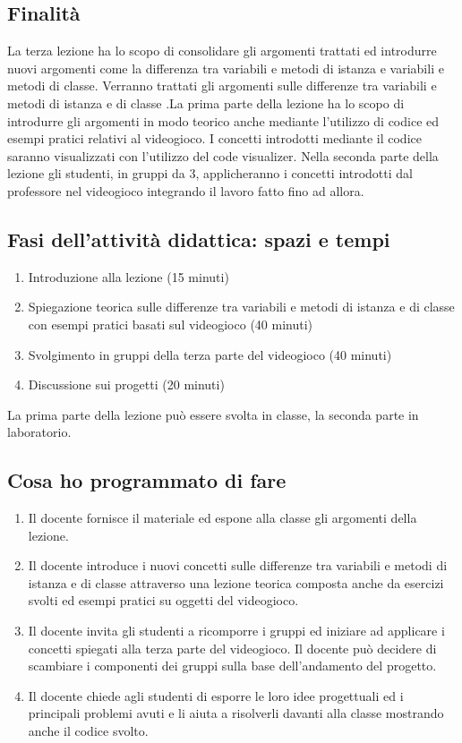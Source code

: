 \documentclass[12pt,a4paper]{article}
\begin{document}
\subsection*{Finalità}
La terza lezione ha lo scopo di consolidare gli argomenti trattati ed introdurre nuovi argomenti come la differenza tra variabili e metodi di istanza e variabili e metodi di classe. Verranno trattati gli argomenti sulle differenze tra variabili e metodi di istanza e di classe .La prima parte della lezione ha lo scopo di introdurre gli argomenti in modo teorico anche mediante l’utilizzo di codice ed esempi pratici relativi al videogioco. I concetti introdotti mediante il codice saranno visualizzati con l’utilizzo del code visualizer. Nella seconda parte della lezione gli studenti, in gruppi da 3, applicheranno i concetti introdotti dal professore nel videogioco integrando il lavoro fatto fino ad allora. 


\subsection*{Fasi dell'attività didattica: spazi e tempi}

\begin{enumerate}
    \item Introduzione alla lezione (15 minuti)
\item Spiegazione teorica sulle differenze tra variabili e metodi di istanza e di classe con esempi pratici basati sul videogioco (40 minuti)
\item Svolgimento in gruppi della terza parte del videogioco (40 minuti)
\item Discussione sui progetti (20 minuti)

\end{enumerate}
La prima parte della lezione può essere svolta in classe, la seconda parte in laboratorio.

\subsection*{Cosa ho programmato di fare}
\begin{enumerate}
\item Il docente fornisce il materiale ed espone alla classe gli argomenti della lezione.
\item Il docente introduce i nuovi concetti sulle differenze tra variabili e metodi di istanza e di classe attraverso una lezione teorica composta anche da esercizi svolti ed esempi pratici su oggetti del videogioco.
\item Il docente invita gli studenti a ricomporre i gruppi ed iniziare ad applicare i concetti spiegati alla terza parte del videogioco. Il docente può decidere di scambiare i componenti dei gruppi sulla base dell’andamento del progetto.
\item Il docente chiede agli studenti di esporre le loro idee progettuali ed i principali problemi avuti e li aiuta a risolverli davanti alla classe mostrando anche il codice svolto.

\end{enumerate}
\end{document}

